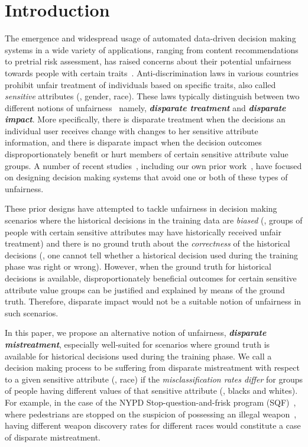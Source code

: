 \documentclass[letterpaper]{sig-alternate-2013}
\newcommand{\disc}{disparate mistreatment}
\begin{document}
\section{Introduction}\label{sec:intro}
\noindent

The emergence and widespread usage of automated data-driven decision
making systems in a wide variety of applications, ranging from content
recommendations to pretrial risk assessment, has raised concerns about
their potential unfairness towards people with certain
traits~\cite{crawford_ai_disc,bigdatawhitehouse2016,bigdatawhitehouse2014,sweeney_queue}.
Anti-discrimination laws in va\-rious countries prohibit unfair
treatment of in\-di\-vi\-duals based on specific traits, also called
\textit{sensitive} attributes (\eg, gender, race).  These laws
typically distinguish between two different notions of
unfairness~\cite{barocas_2016} namely, \textbf{\textit{disparate
    treatment}}
and \textbf{\textit{disparate impact}}.
More spe\-ci\-fi\-cally, there is disparate treatment when the
decisions an individual user receives change with changes to her
sensitive attribute information, and there is disparate impact when
the decision outcomes disproportionately benefit or hurt members of
certain sensitive attribute value groups.
A number of recent studies~\cite{feldman_kdd15, salvatore_knn,
  icml2013_zemel13}, including our own prior
work~\cite{zafar_fairness}, have focused on de\-signing decision
making systems that avoid one or both of these types of unfairness.


These prior designs have attempted to tackle unfairness in decision
making scenarios where the historical decisions
in the training data are \emph{biased} (\ie, groups of people with
certain sensitive attributes may have historically received unfair treatment)
and there is no ground truth about the \emph{correctness}
of the historical decisions (\ie, one cannot tell whether a historical decision used during the
training phase was right or wrong).
However, when the ground truth
for historical decisions is available,
disproportionately beneficial outcomes for certain sensitive attribute
value groups can be justified and explained by means of the
ground truth. Therefore, disparate impact would not be a suitable notion of
unfairness in such scenarios.



In this paper, we propose an alternative notion of
unfairness, \textbf{\textit{\disc{}}}, especially well-suited for
scenarios where ground truth is available for historical decisions used during
the training phase.
We call a decision ma\-king process to be suffering from \disc{} with
respect to a given sensitive attribute (\eg, race) if the
\emph{misclassification rates differ} for groups of people having different values
of that sensitive attribute (\eg, blacks and whites).
 For example, in the case of the NYPD Stop-question-and-frisk program
(SQF)~\cite{sqf_wiki}, where pedestrians are stopped on the suspicion of possessing an illegal
weapon~\cite{goel_frisk}, having different
weapon dis\-co\-ve\-ry rates
for different races would constitute a case of \disc{}.
\end{document}
